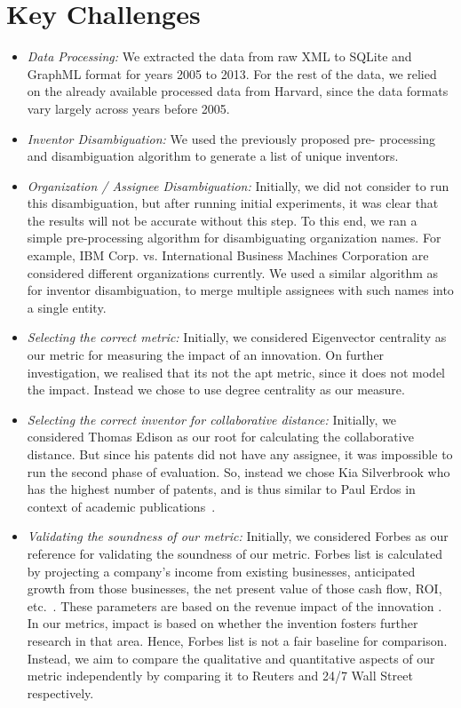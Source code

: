\section{Key Challenges}
	\begin{itemize}
		\item {\em Data Processing:} We extracted the data from raw XML to SQLite and
		GraphML format for years 2005 to 2013. For the rest of the data, we relied on
		the already available processed data from Harvard, since the data formats vary largely across years before 2005.
		\item {\em Inventor Disambiguation:} We used the previously proposed pre-
		processing and disambiguation algorithm to generate a list of unique
		inventors.
		\item {\em Organization / Assignee Disambiguation:} 
		Initially, we did not consider to run this disambiguation, but after running initial experiments, it was clear that the results will not be accurate without this step. 
		To this end, we ran a simple pre-processing algorithm for disambiguating
		organization names. For example, IBM Corp. vs. International Business Machines
		Corporation are considered different organizations currently. We used a
		similar algorithm as for inventor disambiguation, to merge multiple assignees
		with such names into a single entity.
		\item{\em Selecting the correct metric:} Initially, we considered Eigenvector centrality as our metric for measuring the impact of an innovation. On further investigation, we realised that its not the apt metric, since it does not model the impact. Instead we chose to use degree centrality as our measure. 
		\item{\em Selecting the correct inventor for collaborative distance:} Initially, we considered Thomas Edison as our root for calculating the collaborative distance. But since his patents did not have any assignee, it was impossible to run the second phase of evaluation. So, instead we chose Kia Silverbrook who has the highest number of patents, and is thus similar to  Paul Erdos in context of academic publications~\cite{erdos}. 
		\item{\em Validating the soundness of our metric:} Initially, we considered Forbes as our reference for validating the soundness of our metric. Forbes list is calculated by projecting a company’s income from existing businesses, anticipated growth from those businesses, the net present value of those cash flow, ROI, etc.~\cite{forbeshow}. These parameters are based on the revenue impact of the innovation . In our metrics, impact is based on whether the invention fosters further research in that area. Hence, Forbes list is not a  fair baseline for comparison. Instead, we aim to compare the qualitative and quantitative aspects of our metric independently by comparing it to Reuters and 24/7 Wall Street respectively.

\end{itemize}
